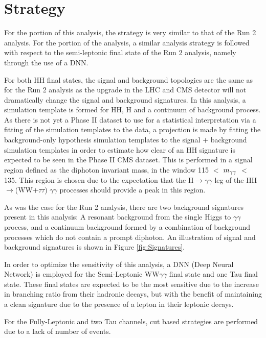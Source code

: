 \section{Strategy} \label{sec:Strategy_Phase_II}

For the \wwgg portion of this analysis, the strategy is very similar to that of the Run 2 analysis. For the \ttgg portion of the analysis, a similar analysis strategy is followed with respect to the semi-leptonic final state of the Run 2 analysis, namely through the use of a DNN. 

For both HH final states, the signal and background topologies are the same as for the Run 2 analysis as the upgrade in the LHC and CMS detector will not dramatically change the signal and background signatures. In this analysis, a simulation template is formed for HH, H and a continuum of background process. As there is not yet a Phase II dataset to use for a statistical interpretation via a fitting of the simulation templates to the data, a projection is made by fitting the background-only hypothesis simulation templates to the signal $+$ background simulation templates in order to estimate how clear of an HH signature is expected to be seen in the Phase II CMS dataset. This is performed in a signal region defined as the diphoton invariant mass, in the window 115 $<$ $m_{\gamma\gamma}$ $<$ 135. This region is chosen due to the expectation that the H$\rightarrow\gamma\gamma$ leg of the HH$\rightarrow$(WW$+\tau\tau$) $\gamma\gamma$ processes should provide a peak in this region. 

As was the case for the Run 2 analysis, there are two background signatures present in this analysis: A resonant background from the single Higgs to $\gamma\gamma$ process, and a continuum background formed by a combination of background processes which do not contain a prompt diphoton. An illustration of signal and background signatures is shown in Figure \ref{fig:Signatures}.

In order to optimize the sensitivity of this analysis,
a DNN (Deep Neural Network) is employed for the Semi-Leptonic WW$\gamma\gamma$ final state and one Tau \ttgg final state. These final states are expected to be the most sensitive due to the increase in branching ratio
from their hadronic decays, but with the benefit of maintaining a clean signature due to the presence of a lepton in their leptonic decays.

For the Fully-Leptonic \wwgg and two Tau \ttgg channels, cut based strategies are performed due to a lack of number of events.

